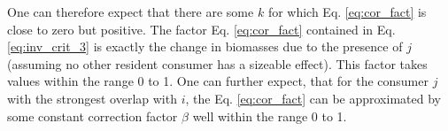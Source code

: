 \documentclass[a4paper]{report}
\begin{document}
{One can therefore expect that there are some $k$ for which Eq. \eqref{eq:cor_fact} is close to zero but positive. The factor  Eq. \eqref{eq:cor_fact} contained in Eq. \eqref{eq:inv_crit_3} is exactly the change in biomasses due to the presence of $j$ (assuming no other resident consumer has a sizeable effect). This factor takes values within the range 0 to 1. One can further expect, that for the consumer $j$ with the strongest overlap with $i$, the Eq. \eqref{eq:cor_fact} can be approximated by some constant correction factor $\beta$ well within the range 0 to 1.  \\


%
%
%
%
%  
%  
}
\end{document}
